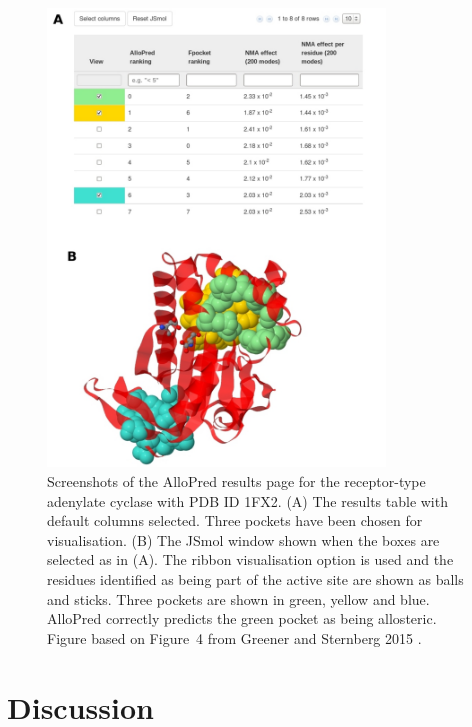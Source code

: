 \begin{figure}
\centering

\includegraphics[width=0.8\textwidth]{figures/web_results/web_results}

\caption[Screenshots of the AlloPred web server results page]
{Screenshots of the AlloPred results page for the receptor-type adenylate cyclase with PDB ID 1FX2.
(A) The results table with default columns selected.
Three pockets have been chosen for visualisation.
(B) The JSmol window shown when the boxes are selected as in (A).
The ribbon visualisation option is used and the residues identified as being part of the active site are shown as balls and sticks.
Three pockets are shown in green, yellow and blue.
AlloPred correctly predicts the green pocket as being allosteric.
Figure based on Figure~4 from Greener and Sternberg 2015 \cite{Greener2015}.}

\label{fig:web_results}
\end{figure}


\section{Discussion}
\label{sec:allopred_discussion}

